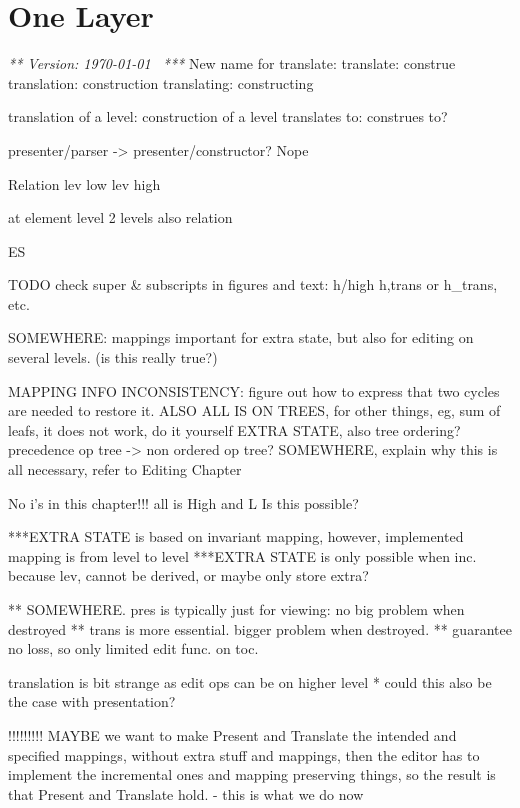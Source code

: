 \chapter{One Layer}
\label{chap:singleLayer}

{\em *** Version: \today~ ***}
\bc
New name for translate:
translate: construe
translation: construction
translating: constructing

translation of a level: construction of a level
translates to: construes to?

presenter/parser -> presenter/constructor? Nope





Relation
lev low lev high

at element level 2 levels also relation

ES

TODO
check super & subscripts in figures and text: h/high h,trans or h_trans, etc.

SOMEWHERE: mappings important for extra state, but also for editing on several levels. (is this really true?)

MAPPING INFO INCONSISTENCY: figure out how to express that two cycles are needed to restore it.
ALSO ALL IS ON TREES, for other things, eg, sum of leafs, it does not work, do it yourself
EXTRA STATE, also tree ordering? precedence op tree -> non ordered op tree?
SOMEWHERE, explain why this is all necessary, refer to Editing Chapter

No i's in this chapter!!! all is High and L Is this possible?

***EXTRA STATE is based on invariant mapping, however, implemented mapping is from level to level
***EXTRA STATE is only possible when inc. because lev, cannot be derived, or maybe only store extra?

** SOMEWHERE. pres is typically just for viewing: no big problem when destroyed
** trans is more essential. bigger problem when destroyed.
** guarantee no loss, so only limited edit func. on toc.

translation is bit strange as edit ops can be on higher level
* could this also be the case with presentation?


!!!!!!!!!
MAYBE we want to make Present and Translate the intended and specified mappings, 
without extra stuff and mappings, then the editor has to implement the incremental ones
 and mapping preserving things, so the result is that Present and Translate hold.
- this is what we do now

